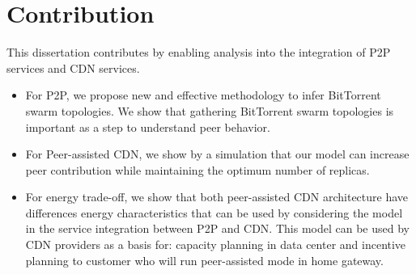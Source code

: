 \section{Contribution}
This dissertation  contributes by enabling analysis into the integration of P2P services and CDN services.
\begin{itemize}
	\item For P2P, we propose new and effective methodology to infer BitTorrent swarm topologies. 
	We show that gathering BitTorrent swarm topologies is important as a step to understand peer behavior. 
	\item For Peer-assisted CDN, we show by a simulation that our model can increase peer contribution while maintaining the optimum number of replicas.
	\item For energy trade-off, we show that both peer-assisted CDN architecture have differences  energy characteristics that can be used by considering the model in the service integration between P2P and CDN. 
	This model can be used by CDN providers as a basis for: capacity planning in data center and incentive planning to customer who will run peer-assisted mode in home gateway.
\end{itemize}
